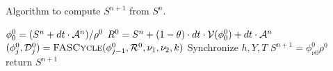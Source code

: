 \documentclass[11pt]{article}
\begin{document}
\begin{algorithm}[H]
\caption{Algorithm to compute ${S}^{n+1}$ from ${S}^{n}$.}
\begin{algorithmic}
   \State ${\phi}^{0}_{0} = ({S}^{n} + dt \cdot {\cal A}^{n})/ {\rho}^{0}$
   \State ${R}^{0} = {S}^{n} + (1-\theta)\cdot dt \cdot {\cal V}({\phi}^{0}_{0})
                           + dt \cdot {\cal A}^{n}$
      \State $({\phi}^{0}_{j},{\cal D}^{0}_{j}) = \mbox{\sc FASCycle}({\phi}^{0}_{j-1},{\cal R}^{0},{\nu_1},{\nu_2},k)$
   \EndFor
   \State Synchronize $h,Y,T$
   \State ${S}^{n+1} = {\phi}^{0}_{\nu0} {\rho}^{0}$
   \State return ${S}^{n+1}$
\EndProcedure
\end{algorithmic}
\end{algorithm}
\end{document}
